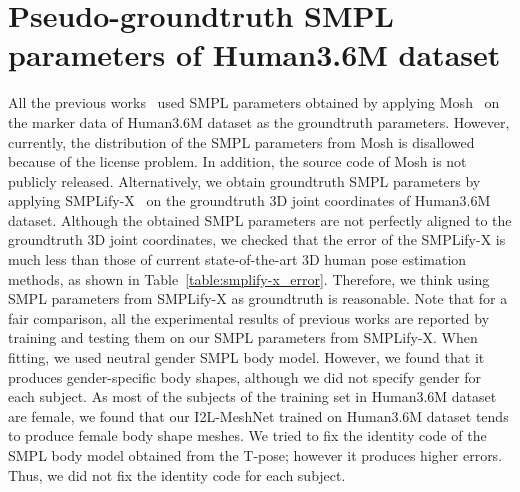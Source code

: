 \documentclass[runningheads]{llncs}
\begin{document}
\begin{table}
\centering
\setlength\tabcolsep{1.0pt}
\def\arraystretch{1.1}
\caption{The MPJPE and PA MPJPE of PoseNet on each dataset.}
\vspace*{-7mm}
\label{table:posenet_error}
\end{table}

\newpage

\section{Pseudo-groundtruth SMPL parameters of Human3.6M dataset}
All the previous works~\cite{kanazawa2018end,pavlakos2018learning,kolotouros2019convolutional,kolotouros2019learning} used SMPL parameters obtained by applying Mosh~\cite{loper2014mosh} on the marker data of Human3.6M dataset as the groundtruth parameters.
However, currently, the distribution of the SMPL parameters from Mosh is disallowed because of the license problem.
In addition, the source code of Mosh is not publicly released.
Alternatively, we obtain groundtruth SMPL parameters by applying SMPLify-X~\cite{pavlakos2019expressive} on the groundtruth 3D joint coordinates of Human3.6M dataset.
Although the obtained SMPL parameters are not perfectly aligned to the groundtruth 3D joint coordinates, we checked that the error of the SMPLify-X is much less than those of current state-of-the-art 3D human pose estimation methods, as shown in Table~\ref{table:smplify-x_error}. 
Therefore, we think using SMPL parameters from SMPLify-X as groundtruth is reasonable.
Note that for a fair comparison, all the experimental results of previous works are reported by training and testing them on our SMPL parameters from SMPLify-X.
When fitting, we used neutral gender SMPL body model.
However, we found that it produces gender-specific body shapes, although we did not specify gender for each subject.
As most of the subjects of the training set in Human3.6M dataset are female, we found that our I2L-MeshNet trained on Human3.6M dataset tends to produce female body shape meshes.
We tried to fix the identity code of the SMPL body model obtained from the T-pose; however it produces higher errors.
Thus, we did not fix the identity code for each subject.
\end{document}
